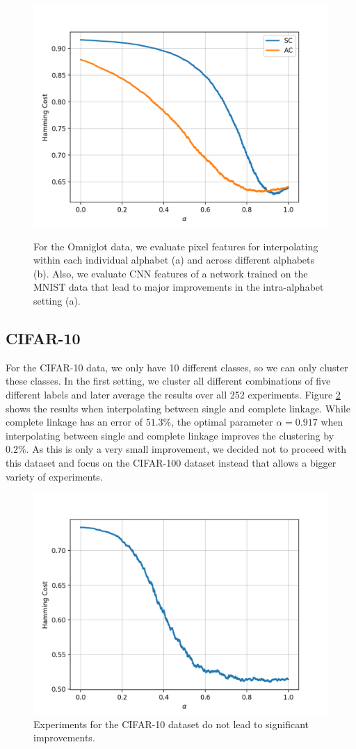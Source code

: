 \begin{figure}[H]
\begin{minipage}{.45\textwidth}
  {\includegraphics[width=\linewidth]{plots/omniglot_inter}}
\end{minipage}
\caption{For the Omniglot data, we evaluate pixel features for interpolating within each individual alphabet (a) and across different alphabets (b). Also, we evaluate CNN features of a network trained on the MNIST data that lead to major improvements in the intra-alphabet setting (a).}
\label{fig:omniglot_overview}
\end{figure}

\subsection{CIFAR-10}

For the CIFAR-10 data, we only have 10 different classes, so we can only cluster these classes. In the first setting, we cluster all different combinations of five different labels and later average the results over all 252 experiments. Figure \ref{fig:cifar10res} shows the results when interpolating between single and complete linkage. While complete linkage has an error of $51.3\%$, the optimal parameter $\alpha = 0.917$ when interpolating between single and complete linkage improves the clustering by $0.2\%$. As this is only a very small improvement, we decided not to proceed with this dataset and focus on the CIFAR-100 dataset instead that allows a bigger variety of experiments.

\begin{figure}[H]
  \centering
  \includegraphics[width=.6\textwidth]{plots/cifar10_sc}
  \caption{Experiments for the CIFAR-10 dataset do not lead to significant improvements.}
  \label{fig:cifar10res}
\end{figure}

